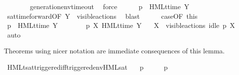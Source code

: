 \begin{isabellebody}
\ \ \ \ \ \ \isamarkupfalse%
\ generation{\isacharunderscore}{\kern0pt}env{\isacharunderscore}{\kern0pt}timeout\ \isamarkupfalse%
\ force{\isacharplus}{\kern0pt}\isanewline
\ \ \ \ \isamarkupfalse%
\ {\isacartoucheopen}{\isasymtheta}{\isacharparenleft}{\kern0pt}p{\isacharparenright}{\kern0pt}\ {\isasymTurnstile}\ {\isasymsigma}{\isacharparenleft}{\kern0pt}HMLt{\isacharunderscore}{\kern0pt}time\ Y\ {\isasymphi}{\isacharparenright}{\kern0pt}{\isacartoucheclose}\ \isamarkupfalse%
\ sat{\isacharunderscore}{\kern0pt}time{\isacharunderscore}{\kern0pt}forward{\isacharbrackleft}{\kern0pt}OF\ {\isacartoucheopen}Y\ {\isasymsubseteq}\ visible{\isacharunderscore}{\kern0pt}actions{\isacartoucheclose}{\isacharbrackright}{\kern0pt}\ \isamarkupfalse%
\ blast\isanewline
\ \ \ \ \isamarkupfalse%
\ case{}{\isacharbrackleft}{\kern0pt}OF\ this{\isacharbrackright}{\kern0pt}\ \isamarkupfalse%
\ {\isacartoucheopen}p\ {\isasymTTurnstile}\ HMLt{\isacharunderscore}{\kern0pt}time\ Y\ {\isasymphi}{\isacartoucheclose}\ \isacommand{{\isachardot}{\kern0pt}}\isamarkupfalse%
\isanewline
\isanewline
\ \ \ \ \isamarkupfalse%
\ {\isacartoucheopen}p\ {\isasymTTurnstile}{\isacharbrackleft}{\kern0pt}X{\isacharbrackright}{\kern0pt}\ HMLt{\isacharunderscore}{\kern0pt}time\ Y\ {\isasymphi}{\isacartoucheclose}\ \isamarkupfalse%
\ {\isacartoucheopen}X\ {\isasymsubseteq}\ visible{\isacharunderscore}{\kern0pt}actions{\isacartoucheclose}\ {\isacartoucheopen}idle\ p\ X{\isacartoucheclose}\ \isamarkupfalse%
\ auto\isanewline
\ \ \isamarkupfalse%
\isanewline
{}\isamarkupfalse%
%
\endisatagproof
{\isafoldproof}%
%
\isadelimproof
%
\endisadelimproof
%
\begin{isamarkuptext}%
Theorems using nicer notation are immediate consequences of this lemma.%
\end{isamarkuptext}\isamarkuptrue%
%
\isadelimvisible
%
\endisadelimvisible
%
\isatagvisible
{}\isamarkupfalse%
\ HMLt{\isacharunderscore}{\kern0pt}sat{\isacharunderscore}{\kern0pt}triggered{\isacharunderscore}{\kern0pt}iff{\isacharunderscore}{\kern0pt}triggered{\isacharunderscore}{\kern0pt}env{\isacharunderscore}{\kern0pt}HML{\isacharunderscore}{\kern0pt}sat{\isacharcolon}{\kern0pt}\isanewline
\ \ \ {\isacartoucheopen}p\ {\isasymTTurnstile}\ {\isasymphi}\ \ {\isasymLongleftrightarrow}\ \ {\isasymtheta}{\isacharparenleft}{\kern0pt}p{\isacharparenright}{\kern0pt}\ {\isasymTurnstile}\ {\isasymsigma}{\isacharparenleft}{\kern0pt}{\isasymphi}{\isacharparenright}{\kern0pt}{\isacartoucheclose}\ \isanewline

\end{isabellebody}
